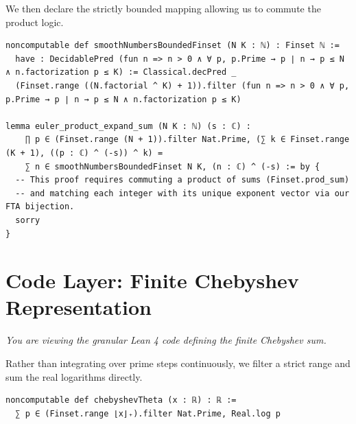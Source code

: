 \documentclass[12pt]{article}
\begin{document}
We then declare the strictly bounded mapping allowing us to commute the product logic.
\begin{lstlisting}
noncomputable def smoothNumbersBoundedFinset (N K : ℕ) : Finset ℕ :=
  have : DecidablePred (fun n => n > 0 ∧ ∀ p, p.Prime → p ∣ n → p ≤ N ∧ n.factorization p ≤ K) := Classical.decPred _
  (Finset.range ((N.factorial ^ K) + 1)).filter (fun n => n > 0 ∧ ∀ p, p.Prime → p ∣ n → p ≤ N ∧ n.factorization p ≤ K)

lemma euler_product_expand_sum (N K : ℕ) (s : ℂ) :
    ∏ p ∈ (Finset.range (N + 1)).filter Nat.Prime, (∑ k ∈ Finset.range (K + 1), ((p : ℂ) ^ (-s)) ^ k) =
    ∑ n ∈ smoothNumbersBoundedFinset N K, (n : ℂ) ^ (-s) := by {
  -- This proof requires commuting a product of sums (Finset.prod_sum) 
  -- and matching each integer with its unique exponent vector via our FTA bijection.
  sorry
}
\end{lstlisting}

\newpage
\section*{Code Layer: Finite Chebyshev Representation}
\label{layer3:chebyshev}

\textit{You are viewing the granular Lean 4 code defining the finite Chebyshev sum.}

Rather than integrating over prime steps continuously, we filter a strict range and sum the real logarithms directly.
\begin{lstlisting}
noncomputable def chebyshevTheta (x : ℝ) : ℝ :=
  ∑ p ∈ (Finset.range ⌊x⌋₊).filter Nat.Prime, Real.log p
\end{lstlisting}
\end{document}
